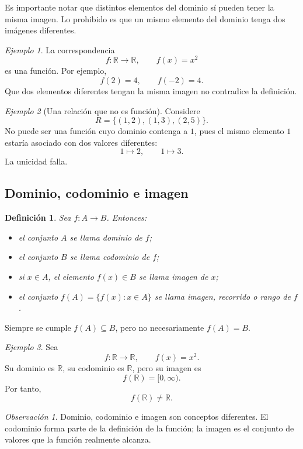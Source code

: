 \documentclass[12pt]{article}
\newtheorem{definicion}{Definición}[section]
\theoremstyle{remark}
\newtheorem{observacion}{Observación}[section]
\newtheorem{ejemplo}{Ejemplo}[section]
\newcommand{\R}{\mathbb{R}}
\begin{document}
Es importante notar que distintos elementos del dominio sí pueden tener la misma imagen. Lo prohibido es que un mismo elemento del dominio tenga dos imágenes diferentes.

\begin{ejemplo}
La correspondencia
\[
f:\R\to\R,\qquad f(x)=x^2
\]
es una función. Por ejemplo,
\[
f(2)=4,\qquad f(-2)=4.
\]
Que dos elementos diferentes tengan la misma imagen no contradice la
definición.
\end{ejemplo}

\begin{ejemplo}[Una relación que no es función]
Considere
\[
R=\{(1,2),(1,3),(2,5)\}.
\]
No puede ser una función cuyo dominio contenga a $1$, pues el mismo elemento $1$ estaría asociado con dos valores diferentes:
\[
1\mapsto2,\qquad 1\mapsto3.
\]
La unicidad falla.
\end{ejemplo}
\subsection{Dominio, codominio e imagen}
\begin{definicion}
Sea $f:A\to B$. Entonces:

\begin{itemize}
    \item el conjunto $A$ se llama \emph{dominio} de $f$;
    \item el conjunto $B$ se llama \emph{codominio} de $f$;
    \item si $x\in A$, el elemento $f(x)\in B$ se llama \emph{imagen} de $x$;
    \item el conjunto $f(A)=\{f(x):x\in A\}$ se llama \emph{imagen}, \emph{recorrido} o \emph{rango} de $f$.
\end{itemize}
\end{definicion}

Siempre se cumple $f(A)\subseteq B$, pero no necesariamente $f(A)=B$.

\begin{ejemplo}
Sea
\[
f:\R\to\R,\qquad f(x)=x^2.
\]
Su dominio es $\R$, su codominio es $\R$, pero su imagen es
\[
f(\R)=[0,\infty).
\]
Por tanto,
\[
f(\R)\neq\R.
\]
\end{ejemplo}

\begin{observacion}
Dominio, codominio e imagen son conceptos diferentes. El codominio forma parte de la definición de la función; la imagen es el conjunto de valores que la función realmente alcanza.
\end{observacion}
\end{document}
